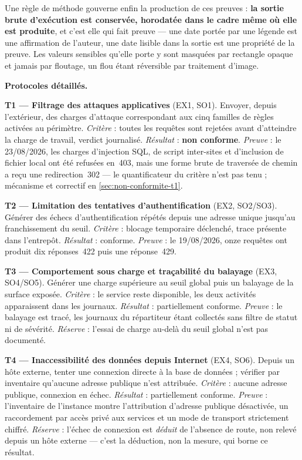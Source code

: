 Une règle de méthode gouverne enfin la production de ces preuves : \textbf{la sortie brute
d'exécution est conservée, horodatée dans le cadre même où elle est produite}, et c'est elle qui
fait preuve --- une date portée par une légende est une affirmation de l'auteur, une date lisible
dans la sortie est une propriété de la preuve. Les valeurs sensibles qu'elle porte y sont masquées
par rectangle opaque et jamais par floutage, un flou étant réversible par traitement d'image.

\medskip
\noindent\textbf{Protocoles détaillés.}

\textbf{T1 --- Filtrage des attaques applicatives} (EX1, SO1). Envoyer, depuis l'extérieur, des
charges d'attaque correspondant aux cinq familles de règles activées au périmètre.
\emph{Critère} : toutes les requêtes sont rejetées avant d'atteindre la charge de travail, verdict
journalisé. \emph{Résultat} : \textbf{non conforme}. \emph{Preuve} : le 23/08/2026, les charges
d'injection SQL, de script inter-sites et d'inclusion de fichier local ont été refusées en~403,
mais une forme brute de traversée de chemin a reçu une redirection~302 --- le quantificateur du
critère n'est pas tenu ; mécanisme et correctif en \cref{sec:non-conformite-t1}.

\textbf{T2 --- Limitation des tentatives d'authentification} (EX2, SO2/SO3). Générer des échecs
d'authentification répétés depuis une adresse unique jusqu'au franchissement du seuil.
\emph{Critère} : blocage temporaire déclenché, trace présente dans l'entrepôt. \emph{Résultat} :
conforme. \emph{Preuve} : le 19/08/2026, onze requêtes ont produit dix réponses~422 puis une
réponse~429.

\textbf{T3 --- Comportement sous charge et traçabilité du balayage} (EX3, SO4/SO5). Générer une
charge supérieure au seuil global puis un balayage de la surface exposée. \emph{Critère} : le
service reste disponible, les deux activités apparaissent dans les journaux. \emph{Résultat} :
partiellement conforme. \emph{Preuve} : le balayage est tracé, les journaux du répartiteur étant
collectés sans filtre de statut ni de sévérité. \emph{Réserve} : l'essai de charge au-delà du seuil
global n'est pas documenté.

\textbf{T4 --- Inaccessibilité des données depuis Internet} (EX4, SO6). Depuis un hôte externe,
tenter une connexion directe à la base de données ; vérifier par inventaire qu'aucune adresse
publique n'est attribuée. \emph{Critère} : aucune adresse publique, connexion en échec.
\emph{Résultat} : partiellement conforme. \emph{Preuve} : l'inventaire de l'instance montre
l'attribution d'adresse publique désactivée, un raccordement par accès privé aux services et un
mode de transport strictement chiffré. \emph{Réserve} : l'échec de connexion est \emph{déduit} de
l'absence de route, non relevé depuis un hôte externe --- c'est la déduction, non la mesure, qui
borne ce résultat.

